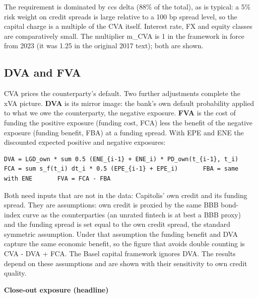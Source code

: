\documentclass[11pt,letterpaper]{article}
\begin{document}
The requirement is dominated by ccs delta (88\% of the total), as is typical: a 5\% risk weight on credit spreads is large relative to a 100 bp spread level, so the capital charge is a multiple of the CVA itself. Interest rate, FX and equity classes are comparatively small. The multiplier m\_CVA is 1 in the framework in force from 2023 (it was 1.25 in the original 2017 text); both are shown.

\subsection{DVA and FVA}
CVA prices the counterparty's default. Two further adjustments complete the xVA picture. \textbf{DVA} is its mirror image: the bank's own default probability applied to what we owe the counterparty, the negative exposure. \textbf{FVA} is the cost of funding the positive exposure (funding cost, FCA) less the benefit of the negative exposure (funding benefit, FBA) at a funding spread. With EPE and ENE the discounted expected positive and negative exposures:

{\fontsize{7.2}{8.8}\selectfont
\begin{verbatim}
DVA = LGD_own * sum 0.5 (ENE_{i-1} + ENE_i) * PD_own(t_{i-1}, t_i)
FCA = sum s_f(t_i) dt_i * 0.5 (EPE_{i-1} + EPE_i)       FBA = same with ENE       FVA = FCA - FBA
\end{verbatim}}
Both need inputs that are not in the data: Capitolis' own credit and its funding spread. They are assumptions: own credit is proxied by the same BBB bond-index curve as the counterparties (an unrated fintech is at best a BBB proxy) and the funding spread is set equal to the own credit spread, the standard symmetric assumption. Under that assumption the funding benefit and DVA capture the same economic benefit, so the figure that avoids double counting is CVA - DVA + FCA. The Basel capital framework ignores DVA. The results depend on these assumptions and are shown with their sensitivity to own credit quality.

\textbf{Close-out exposure (headline)}
\end{document}
